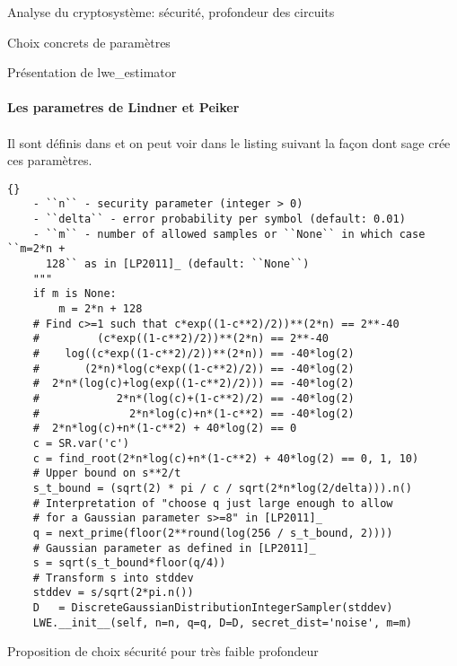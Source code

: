 \begin{section}{Analyse du cryptosystème: sécurité, profondeur des circuits}
\begin{subsection}{Choix concrets de paramètres}
\begin{subsubsection}{Présentation de lwe\_estimator}
	\paragraph{}
	\textbf{Les parametres de Lindner et Peiker}
	\paragraph{}
	Il sont définis dans  \cite{EPRINT:LinPei10a} et on peut voir dans 
	le listing suivant la façon dont sage crée ces paramètres.
	\begin{lstlisting}{}
	- ``n`` - security parameter (integer > 0)
	- ``delta`` - error probability per symbol (default: 0.01)
	- ``m`` - number of allowed samples or ``None`` in which case ``m=2*n +
	  128`` as in [LP2011]_ (default: ``None``)
	"""
	if m is None:
	    m = 2*n + 128
	# Find c>=1 such that c*exp((1-c**2)/2))**(2*n) == 2**-40
	#         (c*exp((1-c**2)/2))**(2*n) == 2**-40
	#    log((c*exp((1-c**2)/2))**(2*n)) == -40*log(2)
	#       (2*n)*log(c*exp((1-c**2)/2)) == -40*log(2)
	#  2*n*(log(c)+log(exp((1-c**2)/2))) == -40*log(2)
	#            2*n*(log(c)+(1-c**2)/2) == -40*log(2)
	#              2*n*log(c)+n*(1-c**2) == -40*log(2)
	#  2*n*log(c)+n*(1-c**2) + 40*log(2) == 0
	c = SR.var('c')
	c = find_root(2*n*log(c)+n*(1-c**2) + 40*log(2) == 0, 1, 10)
	# Upper bound on s**2/t
	s_t_bound = (sqrt(2) * pi / c / sqrt(2*n*log(2/delta))).n()
	# Interpretation of "choose q just large enough to allow 
	# for a Gaussian parameter s>=8" in [LP2011]_
	q = next_prime(floor(2**round(log(256 / s_t_bound, 2))))
	# Gaussian parameter as defined in [LP2011]_
	s = sqrt(s_t_bound*floor(q/4))
	# Transform s into stddev
	stddev = s/sqrt(2*pi.n())
	D   = DiscreteGaussianDistributionIntegerSampler(stddev)
	LWE.__init__(self, n=n, q=q, D=D, secret_dist='noise', m=m)
	\end{lstlisting}
	\end{subsubsection}

	\begin{subsubsection}{Proposition de choix sécurité pour très faible profondeur}
	\end{subsubsection}

	\end{subsection}
\end{section}
